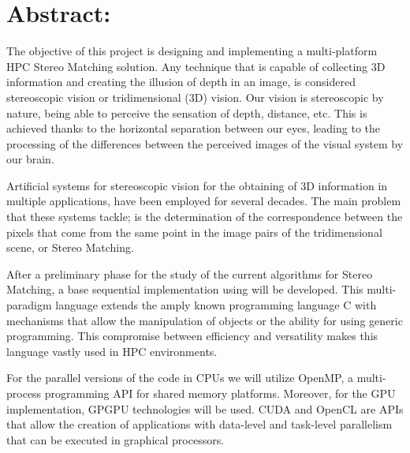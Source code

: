 %
%

\section*{Abstract:}

The objective of this project is designing and implementing a multi-platform HPC Stereo Matching solution. Any technique that is capable of collecting 3D information and creating the illusion of depth in an image, is considered stereoscopic vision or tridimensional (3D) vision. Our vision is stereoscopic by nature, being able to perceive the sensation of depth, distance, etc. This is achieved thanks to the horizontal separation between our eyes, leading to the processing of the differences between the perceived images of the visual system by our brain.

Artificial systems for stereoscopic vision for the obtaining of 3D information in multiple applications, have been employed for several decades. The main problem that these systems tackle; is the determination of the correspondence between the pixels that come from the same point in the image pairs of the tridimensional scene, or Stereo Matching.

After a preliminary phase for the study of the current algorithms for Stereo Matching, a base sequential implementation using \CC will be developed. This multi-paradigm language extends the amply known programming language C with mechanisms that allow the manipulation of objects or the ability for using generic programming. This compromise between efficiency and versatility makes this language vastly used in HPC environments.

For the parallel versions of the code in CPUs we will utilize OpenMP, a multi-process programming API for shared memory platforms. Moreover, for the GPU implementation, GPGPU technologies will be used. CUDA and OpenCL are APIs that allow the creation of applications with data-level and task-level parallelism that can be executed in graphical processors.  





